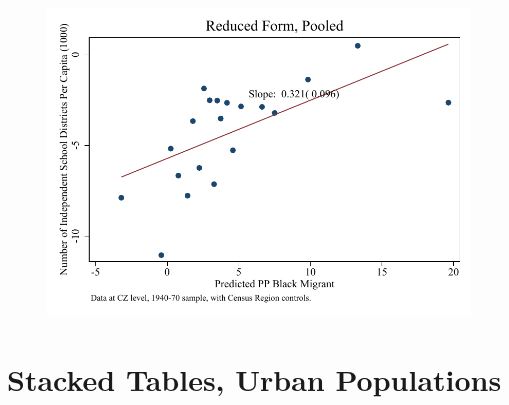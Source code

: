 \documentclass{article}
\begin{document}
\begin{figure}
\centering
\includegraphics{figures/simplefigs/pooled_schdist_ind_pc_C3_rf.pdf}
\end{figure}
\clearpage


\section{Stacked Tables, Urban Populations}
\end{document}
